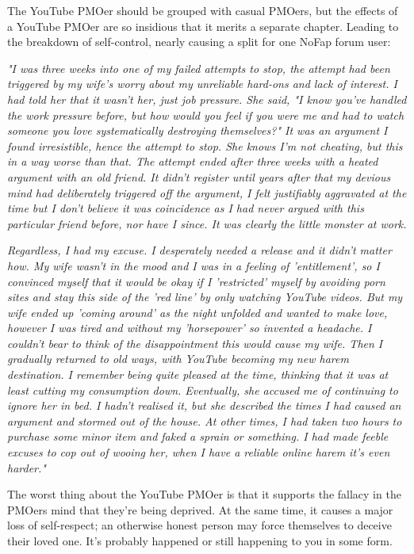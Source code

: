 \documentclass[easypeasy.tex]{subfiles}
\begin{document}
The YouTube PMOer should be grouped with casual PMOers, but the effects of a YouTube PMOer are so insidious that it merits a separate chapter. Leading to the breakdown of self-control, nearly causing a split for one NoFap forum user:

\textit{"I was three weeks into one of my failed attempts to stop, the attempt had been triggered by my wife's worry about my unreliable hard-ons and lack of interest. I had told her that it wasn't her, just job pressure. She said, "I know you've handled the work pressure before, but how would you feel if you were me and had to watch someone you love systematically destroying themselves?" It was an argument I found irresistible, hence the attempt to stop. She knows I'm not cheating, but this in a way worse than that. The attempt ended after three weeks with a heated argument with an old friend. It didn't register until years after that my devious mind had deliberately triggered off the argument, I felt justifiably aggravated at the time but I don't believe it was coincidence as I had never argued with this particular friend before, nor have I since. It was clearly the little monster at work.}

\textit{Regardless, I had my excuse. I desperately needed a release and it didn't matter how. My wife wasn't in the mood and I was in a feeling of 'entitlement', so I convinced myself that it would be okay if I 'restricted' myself by avoiding porn sites and stay this side of the 'red line' by only watching YouTube videos. But my wife ended up 'coming around' as the night unfolded and wanted to make love, however I was tired and without my 'horsepower' so invented a headache. I couldn't bear to think of the disappointment this would cause my wife. Then I gradually returned to old ways, with YouTube becoming my new harem destination. I remember being quite pleased at the time, thinking that it was at least cutting my consumption down. Eventually, she accused me of continuing to ignore her in bed. I hadn't realised it, but she described the times I had caused an argument and stormed out of the house. At other times, I had taken two hours to purchase some minor item and faked a sprain or something. I had made feeble excuses to cop out of wooing her, when I have a reliable online harem it's even harder."}

The worst thing about the YouTube PMOer is that it supports the fallacy in the PMOers mind that they're being deprived. At the same time, it causes a major loss of self-respect; an otherwise honest person may force themselves to deceive their loved one. It's probably happened or still happening to you in some form.
\end{document}
